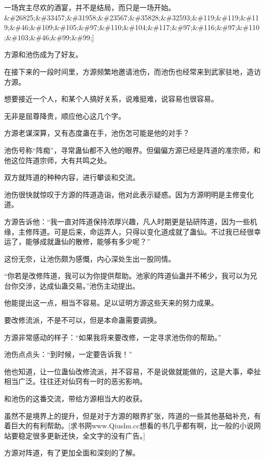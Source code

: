 
\begin{this_body}

一场宾主尽欢的酒宴，并不是结局，而只是一场开始。\&\#26825;\&\#33457;\&\#31958;\&\#23567;\&\#35828;\&\#32593;\&\#119;\&\#119;\&\#119;\&\#46;\&\#109;\&\#105;\&\#97;\&\#110;\&\#104;\&\#117;\&\#97;\&\#116;\&\#97;\&\#110;\&\#103;\&\#46;\&\#99;\&\#99;]

方源和池伤成为了好友。

在接下来的一段时间里，方源频繁地邀请池伤，而池伤也经常来到武家驻地，造访方源。

想要接近一个人，和某个人搞好关系，说难挺难，说容易也很容易。

无非是屈尊降贵，顺应他心这几个字。

方源老谋深算，又有态度蛊在手，池伤怎可能是他的对手？

池伤号称“阵痴”，寻常蛊仙都不入他的眼界。但偏偏方源已经是阵道的准宗师，和他这位阵道宗师，大有共鸣之处。

双方就阵道的种种内容，进行攀谈和交流。

池伤很快就惊叹于方源的阵道造诣，他对此表示疑惑。因为方源明明是主修变化道。

方源告诉他：“我一直对阵道保持浓厚兴趣，凡人时期更是钻研阵道，因为一些机缘，主修阵道。可是后来，命运弄人，只得以变化道成就了蛊仙。不过我已经很幸运了，能够成就蛊仙的散修，能够有多少呢？”

这份无奈，让池伤颇为感慨，内心深处生出一股同情。

“你若是改修阵道，我可以为你提供帮助。池家的阵道仙蛊并不稀少，我可以为兄台你交涉，达成仙蛊交易。”池伤主动提出。

他能提出这一点，相当不容易。足以证明方源这些天来的努力成果。

要改修流派，不是不可以，但是本命蛊需要调换。

方源非常感动的样子：“如果我将来要改修，一定寻求池伤你的帮助。”

池伤点点头：“到时候，一定要告诉我！”

他也知道，让一位蛊仙改修流派，并不容易，不是说做就能做的，这是大事，牵扯相当广泛。往往还对仙窍有一时的恶劣影响。

和池伤的这番交流，带给方源相当大的收获。

虽然不是境界上的提升，但是对于方源的眼界扩张，阵道的一些其他基础补充，有着巨大的有利帮助。[求书网www.Qiushu.cc想看的书几乎都有啊，比一般的小说网站要稳定很多更新还快，全文字的没有广告。]

方源对阵道，有了更加全面和深刻的了解。


\end{this_body}
